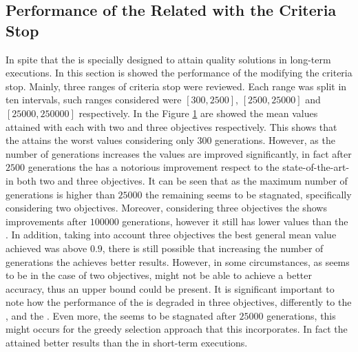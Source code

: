 \subsection{Performance of the \MOEAS{} Related with the Criteria Stop}

In spite that the \VSDMOEA{} is specially designed to attain quality solutions in long-term executions.
%
In this section is showed the performance of the \MOEAS{} modifying the criteria stop.
%
Mainly, three ranges of criteria stop were reviewed.
%
Each range was split in ten intervals, such ranges considered were $[300, 2500]$, $[2500, 25000]$ and $[25000, 250000]$ respectively.
%
In the Figure \ref{fig:Performance_time} are showed the mean \HV{} values attained with each \MOEA{} with two and three objectives respectively.
%
This shows that the \VSDMOEA{} attains the worst \HV{} values considering only $300$ generations.
%
However, as the number of generations increases the \HV{} values are improved significantly, in fact after $2500$ generations the \VSDMOEA{} has a notorious improvement respect to the state-of-the-art-\MOEAS{} in both two and three objectives.
%
It can be seen that as the maximum number of generations is higher than $25000$ the remaining \MOEAS{} seems to be stagnated, specifically considering two objectives.
%
Moreover, considering three objectives the \RMOEA{} shows improvements after $100000$ generations, however it still has lower values than the \VSDMOEA{}.
%
In addition, taking into account three objectives the best general mean value achieved was above $0.9$, there is still possible that increasing the number of generations the \VSDMOEA{} achieves better results.
%
However, in some circumstances, as seems to be in the case of two objectives, might not be able to achieve a better accuracy, thus an upper bound could be present.
%
It is significant important to note how the performance of the \NSGAII{} is degraded in three objectives, differently to the \RMOEA{}, and the \MOEAD{}.
%
Even more, the \MOEAD{} seems to be stagnated after $25000$ generations, this might occurs for the greedy selection approach that this \MOEA{} incorporates.
%
In fact the \MOEAD{} attained better results than the \RMOEA{} in short-term executions.
%

\begin{figure}[t]
\centering

\label{fig:Performance_time}
\end{figure}





%
%


%
%
